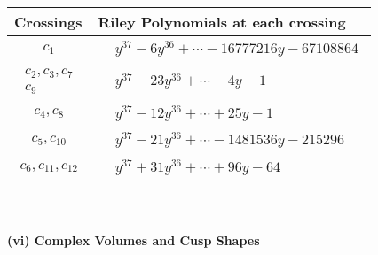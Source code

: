 \documentclass[1p]{elsarticle_modified}
\theoremstyle{definition}
\begin{document}
\begin{tabular}{m{50pt}|m{274pt}}
Crossings & \hspace{64pt}Riley Polynomials at each crossing \\
\hline $$\begin{aligned}c_{1}\end{aligned}$$&$\begin{aligned}
&y^{37}-6 y^{36}+\cdots-16777216 y-67108864
\end{aligned}$\\
\hline $$\begin{aligned}c_{2},c_{3},c_{7}\\c_{9}\end{aligned}$$&$\begin{aligned}
&y^{37}-23 y^{36}+\cdots-4 y-1
\end{aligned}$\\
\hline $$\begin{aligned}c_{4},c_{8}\end{aligned}$$&$\begin{aligned}
&y^{37}-12 y^{36}+\cdots+25 y-1
\end{aligned}$\\
\hline $$\begin{aligned}c_{5},c_{10}\end{aligned}$$&$\begin{aligned}
&y^{37}-21 y^{36}+\cdots-1481536 y-215296
\end{aligned}$\\
\hline $$\begin{aligned}c_{6},c_{11},c_{12}\end{aligned}$$&$\begin{aligned}
&y^{37}+31 y^{36}+\cdots+96 y-64
\end{aligned}$\\
\hline
\end{tabular}\\~\\
\newpage\flushleft \textbf{(vi) Complex Volumes and Cusp Shapes}
\end{document}
